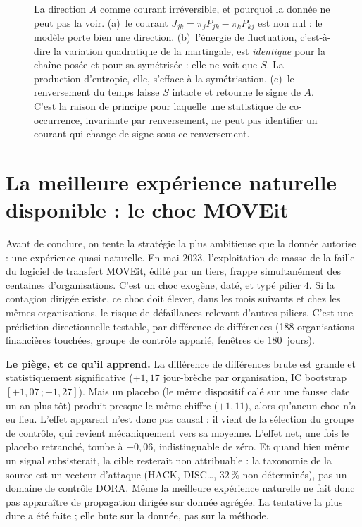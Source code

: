\begin{figure}[htbp]
  \centering
  \caption{La direction $A$ comme courant irréversible, et
pourquoi la donnée ne peut pas la voir. (a)~le courant $J_{jk}=\pi_jP_{jk}-\pi_kP_{kj}$
est non nul : le modèle porte bien une direction. (b)~l'énergie de fluctuation, c'est-à-dire
la variation quadratique de la martingale, est \emph{identique} pour la chaîne posée et pour sa
symétrisée : elle ne voit que $S$. La production d'entropie, elle, s'efface à la symétrisation.
(c)~le renversement du temps laisse $S$ intacte et retourne le signe de $A$. C'est la
raison de principe pour laquelle une statistique de co-occurrence, invariante par renversement,
ne peut pas identifier un courant qui change de signe sous ce renversement.}
  \label{fig:reversibilite}
\end{figure}

\section{La meilleure expérience naturelle disponible : le choc MOVEit}

Avant de conclure, on tente la stratégie la plus ambitieuse que la donnée autorise : une
expérience quasi naturelle. En mai 2023, l'exploitation de masse de la faille du logiciel de
transfert MOVEit, édité par un tiers, frappe simultanément des centaines
d'organisations. C'est un choc exogène, daté, et typé pilier 4. Si la
contagion dirigée existe, ce choc doit élever, dans les mois suivants et chez les mêmes
organisations, le risque de défaillances relevant d'autres piliers. C'est une prédiction
directionnelle testable, par différence de différences (188 organisations financières touchées,
groupe de contrôle apparié, fenêtres de $180$~jours).

\begin{attention}
\textbf{Le piège, et ce qu'il apprend.} La différence de différences brute est grande et
statistiquement significative ($+1{,}17$ jour-brèche par organisation, IC bootstrap
$[+1{,}07\,;+1{,}27]$). Mais un placebo (le même dispositif calé sur une fausse
date un an plus tôt) produit presque le même chiffre ($+1{,}11$), alors qu'aucun choc n'a
eu lieu. L'effet apparent n'est donc pas causal : il vient de la sélection du groupe de
contrôle, qui revient mécaniquement vers sa moyenne. L'effet net, une fois le
placebo retranché, tombe à $+0{,}06$, indistinguable de zéro. Et quand bien même un signal
subsisterait, la cible resterait non attribuable : la taxonomie de la source est un vecteur
d'attaque (HACK, DISC\dots, $32\,\%$ non déterminés), pas un domaine de contrôle DORA. Même
la meilleure expérience naturelle ne fait donc pas apparaître de propagation dirigée sur
donnée agrégée. La tentative la plus dure a été faite ; elle bute sur la donnée, pas sur la
méthode.
\end{attention}

